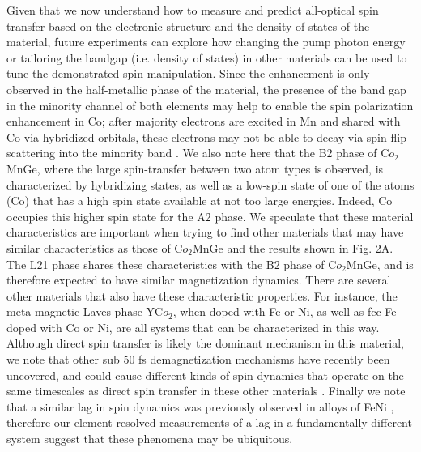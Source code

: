 Given that we now understand how to measure and predict all-optical spin transfer based on the electronic structure and the density of states of the material, future experiments can explore how changing the pump photon energy or tailoring the bandgap (i.e. density of states)\cite{Klaer2009} in other materials can be used to tune the demonstrated spin manipulation. Since the enhancement is only observed in the half-metallic phase of the material, the presence of the band gap in the minority channel of both elements may help to enable the spin polarization enhancement in Co; after majority electrons are excited in Mn and shared with Co via hybridized orbitals, these electrons may not be able to decay via spin-flip scattering into the minority band \cite{Steil2010}. We also note here that the B2 phase of C$o_2$MnGe, where the large spin-transfer between two atom types is observed, is characterized by hybridizing states, as well as a low-spin state of one of the atoms (Co) that has a high spin state available at not too large energies. Indeed, Co occupies this higher spin state for the A2 phase. We speculate that these material characteristics are important when trying to find other materials that may have similar characteristics as those of C$o_2$MnGe and the results shown in Fig. 2A. The L21 phase shares these characteristics with the B2 phase of C$o_2$MnGe, and is therefore expected to have similar magnetization dynamics. There are several other materials that also have these characteristic properties. For instance, the meta-magnetic Laves phase YC$o_2$, when doped with Fe or Ni, as well as fcc Fe doped with Co or Ni, are all systems that can be characterized in this way. Although direct spin transfer is likely the dominant mechanism in this material, we note that other sub 50 fs demagnetization mechanisms have recently been uncovered, and could cause different kinds of spin dynamics that operate on the same timescales as direct spin transfer in these other materials \cite{Gort2018,Tengdin2018}. Finally we note that a similar lag in spin dynamics was previously observed in alloys of FeNi \cite{Mathias2012}, therefore our element-resolved measurements of a lag in a fundamentally different system suggest that these phenomena may be ubiquitous. 

